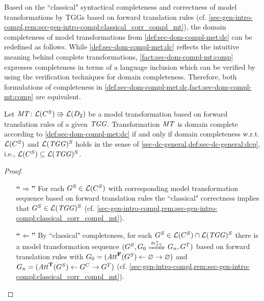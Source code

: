 Based on the ``classical" syntactical completeness and correctness of model transformations by TGGs based on forward translation rules (cf. \cref{sec-gen-intro-compl,rem:sec-gen-intro-compl:classical_corr_compl_mt}), the domain completeness of model transformations from \cref{def:sec-dom-compl-met:dc} can be redefined as follows.
While \cref{def:sec-dom-compl-met:dc} reflects the intuitive meaning behind complete transformations, \cref{fact:sec-dom-compl-mt:comp} expresses completeness in terms of a language inclusion which can be verified by using the verification techniques for domain completeness.
Therefore, both formulations of completeness in \cref{def:sec-dom-compl-met:dc,fact:sec-dom-compl-mt:comp} are equivalent.

\begin{theorem}
\label{fact:sec-dom-compl-mt:comp}
Let $\mathit{MT}\colon \mathcal{L}(C^S) \Rrightarrow \mathcal{L}(D_2)$ be a model transformation based on forward translation rules of a given $\mathit{TGG}$.
Transformation $\mathit{MT}$ is domain complete according to \cref{def:sec-dom-compl-met:dc} if and only if domain completeness w.r.t. $\mathcal{L}(C^S)$ and $\mathcal{L}(\mathit{TGG})^S$ holds in the sense of \cref{sec-dc-general,def:sec-dc-general:dcp}, i.e., $\mathcal{L}(C^S) \subseteq \mathcal{L}(\mathit{TGG})^S$.
\envEndMarker
\end{theorem}

\begin{proof}
\begin{enumerate}
  \item[\textbf{``$\Rightarrow$''}] For each $G^S \in \mathcal{L}(C^S)$ with corresponding model transformation sequence based on forward translation rules the ``classical" correctness implies that $G^S \in \mathcal{L}(\mathit{TGG})^S$ (cf. \cref{sec-gen-intro-compl,rem:sec-gen-intro-compl:classical_corr_compl_mt}).
  \item[\textbf{``$\Leftarrow$''}] By ``classical" completeness, for each $G^S \in \mathcal{L}(C^S) \cap \mathcal{L}(\mathit{TGG})^S$ there is a model transformation sequence $(G^S,G_0 \Trans{\tr^*_\FT} G_n,G^T)$ based on forward translation rules with $G_0=(\mathit{Att}^\mathbf{F}(G^S) \gets \varnothing \to \varnothing)$ and $G_n=(\mathit{Att}^\mathbf{T}(G^S) \gets G^C \to G^T)$ (cf. \cref{sec-gen-intro-compl,rem:sec-gen-intro-compl:classical_corr_compl_mt}).
\end{enumerate}
\end{proof}

